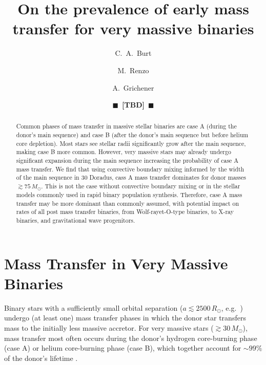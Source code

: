 \documentclass[twocolumn]{aastex63}
\newcommand{\todo}[1]{{\large $\blacksquare$~\textbf{\color{red}[#1]}}~$\blacksquare$}
\begin{document}
\title{On the prevalence of early mass transfer for very massive binaries}

\author[0009-0008-2061-4946]{C.~A.~Burt}

\author[0000-0002-6718-9472]{M.~Renzo}

\author[0000-0002-2215-1841]{A.~Grichener}

\author{\todo{TBD}}

\begin{abstract}
  Common phases of mass transfer in massive stellar binaries are case A
  (during the donor's main sequence) and case B (after the donor's
  main sequence but before helium core depletion). Most stars see
  stellar radii significantly grow after the main sequence, making
  case B more common. However, very massive stars may already undergo
  significant expansion during the main sequence increasing the
  probability of case A mass transfer. We find that using convective
  boundary mixing informed by the width of the main sequence in 30
  Doradus, cass A mass transfer dominates for donor masses
  $\gtrsim 75 \, M_{\odot}$. This is not the case without convective
  boundary mixing or in the stellar models commonly used in rapid
  binary population synthesis.  Therefore, case A mass transfer may be
  more dominant than commonly assumed, with potential impact on rates
  of all post mass transfer binaries, from Wolf-rayet-O-type binaries,
  to X-ray binaries, and gravitational wave progenitors.
\end{abstract}

\section{Mass Transfer in Very Massive Binaries}

Binary stars with a sufficiently small orbital separation
($a\lesssim2500\,R_{\odot}$, e.g.~\citealt{sana:12}) undergo (at least
one) mass transfer phases in which the donor star transfers mass to
the initially less massive accretor. For very massive stars
($ \gtrsim 30 \, M_{\odot}$), mass transfer most often occurs during
the donor's hydrogen core-burning phase (case A) or helium
core-burning phase (case B), which together account for $\sim99\%$ of
the donor's lifetime \citep{kippenhahn:67}.
\end{document}
